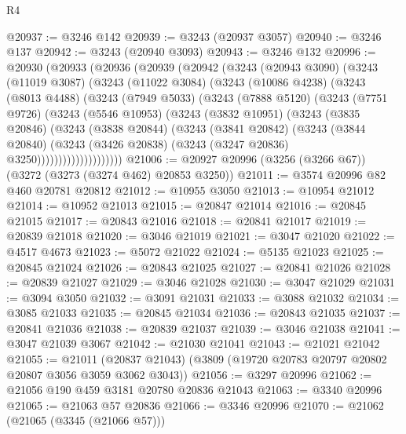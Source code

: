 \begin{lexlean}{R4}
\begin{coremodule}
@20937 := @3246 @142
@20939 := @3243 (@20937 @3057)
@20940 := @3246 @137
@20942 := @3243 (@20940 @3093)
@20943 := @3246 @132
@20996 := @20930
    (@20933
      (@20936
        (@20939
          (@20942
            (@3243
              (@20943 @3090)
              (@3243
                (@11019 @3087)
                (@3243
                  (@11022 @3084)
                  (@3243
                    (@10086 @4238)
                    (@3243
                      (@8013 @4488)
                      (@3243
                        (@7949 @5033)
                        (@3243
                          (@7888 @5120)
                          (@3243
                            (@7751 @9726)
                            (@3243
                              (@5546 @10953)
                              (@3243
                                (@3832 @10951)
                                (@3243
                                  (@3835 @20846)
                                  (@3243
                                    (@3838 @20844)
                                    (@3243
                                      (@3841 @20842)
                                      (@3243
                                        (@3844 @20840)
                                        (@3243
                                          (@3426 @20838)
                                          (@3243 (@3247 @20836) @3250))))))))))))))))))))
@21006 := @20927 @20996 (@3256 (@3266 @67)) (@3272 (@3273 (@3274 @462) @20853 @3250))
@21011 := @3574 @20996 @82 @460 @20781 @20812
@21012 := @10955 @3050
@21013 := @10954 @21012
@21014 := @10952 @21013
@21015 := @20847 @21014
@21016 := @20845 @21015
@21017 := @20843 @21016
@21018 := @20841 @21017
@21019 := @20839 @21018
@21020 := @3046 @21019
@21021 := @3047 @21020
@21022 := @4517 @4673
@21023 := @5072 @21022
@21024 := @5135 @21023
@21025 := @20845 @21024
@21026 := @20843 @21025
@21027 := @20841 @21026
@21028 := @20839 @21027
@21029 := @3046 @21028
@21030 := @3047 @21029
@21031 := @3094 @3050
@21032 := @3091 @21031
@21033 := @3088 @21032
@21034 := @3085 @21033
@21035 := @20845 @21034
@21036 := @20843 @21035
@21037 := @20841 @21036
@21038 := @20839 @21037
@21039 := @3046 @21038
@21041 := @3047 @21039 @3067
@21042 := @21030 @21041
@21043 := @21021 @21042
@21055 := @21011
    (@20837 @21043)
    (@3809 (@19720 @20783 @20797 @20802 @20807 @3056 @3059 @3062 @3043))
@21056 := @3297 @20996
@21062 := @21056 @190 @459 @3181 @20780 @20836 @21043
@21063 := @3340 @20996
@21065 := @21063 @57 @20836
@21066 := @3346 @20996
@21070 := @21062 (@21065 (@3345 (@21066 @57)))

\end{coremodule}
\end{lexlean}
